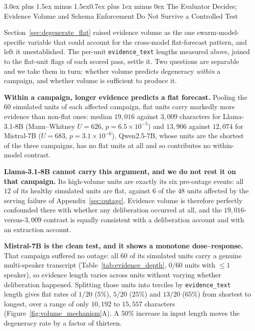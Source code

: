 \documentclass[11pt,journal,onecolumn]{IEEEtran}
\makeatletter
\renewcommand\section{\@startsection{section}{1}{\z@}%
  {3.0ex plus 1.5ex minus 1.5ex}{0.7ex plus 1ex minus 0ex}%
  {\normalfont\normalsize\centering\bfseries}}
\makeatother
\begin{document}
\section{The Evaluator Decides; Evidence Volume and Schema Enforcement Do Not Survive a Controlled Test}
\label{sec:volume_mechanism}

Section~\ref{sec:degenerate_flat} raised evidence volume as the one swarm-model-specific variable that could account for the cross-model flat-forecast pattern, and left it unestablished. The per-unit \texttt{evidence\_text} lengths measured above, joined to the flat-unit flags of each scored pass, settle it. Two questions are separable and we take them in turn: whether volume predicts degeneracy \emph{within} a campaign, and whether volume is sufficient to produce it.

\textbf{Within a campaign, longer evidence predicts a flat forecast.} Pooling the $60$ simulated units of each affected campaign, flat units carry markedly more evidence than non-flat ones: median $19{,}016$ against $3{,}009$ characters for Llama-3.1-8B (Mann--Whitney $U=626$, $p = 6.5\times10^{-5}$) and $13{,}906$ against $12{,}074$ for Mistral-7B ($U=683$, $p = 3.1\times10^{-6}$). Qwen2.5-7B, whose units are the shortest of the three campaigns, has no flat units at all and so contributes no within-model contrast.

\textbf{Llama-3.1-8B cannot carry this argument, and we do not rest it on that campaign.} Its high-volume units are exactly its six pre-outage events: all $12$ of its healthy simulated units are flat, against $6$ of the $48$ units affected by the serving failure of Appendix~\ref{sec:outage}. Evidence volume is therefore perfectly confounded there with whether any deliberation occurred at all, and the $19{,}016$-versus-$3{,}009$ contrast is equally consistent with a deliberation account and with an extraction account.

\textbf{Mistral-7B is the clean test, and it shows a monotone dose--response.} That campaign suffered no outage: all $60$ of its simulated units carry a genuine multi-speaker transcript (Table~\ref{tab:evidence_depth}, $0/60$ units with $\leq 1$ speaker), so evidence length varies across units without varying whether deliberation happened. Splitting those units into terciles by \texttt{evidence\_text} length gives flat rates of $1/20$ ($5\%$), $5/20$ ($25\%$) and $13/20$ ($65\%$) from shortest to longest, over a range of only $10{,}192$ to $15{,}557$ characters (Figure~\ref{fig:volume_mechanism}A). A $50\%$ increase in input length moves the degeneracy rate by a factor of thirteen.
\end{document}
